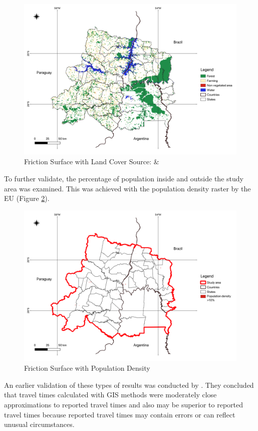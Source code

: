 \documentclass[11pt, a4paper]{report}
\begin{document}
\begin{figure}[H]
  \centering
  \includegraphics[width=0.9\linewidth]{figures/Friction Surface_validation.png}
  \caption{Friction Surface with Land Cover Source: \citep{souza_reconstructing_2020} \& \citep{runfola_geoboundaries_2020}}
  \label{fig:frictionsurfacelandcover}
\end{figure}

To further validate, the percentage of population inside and outside the study area was examined. This was achieved with the population density raster by the EU (Figure \ref{fig:frictionsurfacepopdens}).

\begin{figure}[H]
  \centering
  \includegraphics[width=0.9\linewidth]{figures/Friction Surface_ghsl.png}
  \caption{Friction Surface with Population Density}
  \label{fig:frictionsurfacepopdens}
\end{figure}

An earlier validation of these types of results was conducted by \citet{haynes_validation_2006}. They concluded that travel times calculated with GIS methods were moderately close approximations to reported travel times and also may be superior to reported travel times because reported travel times may contain errors or can reflect unusual circumstances. 
\end{document}
